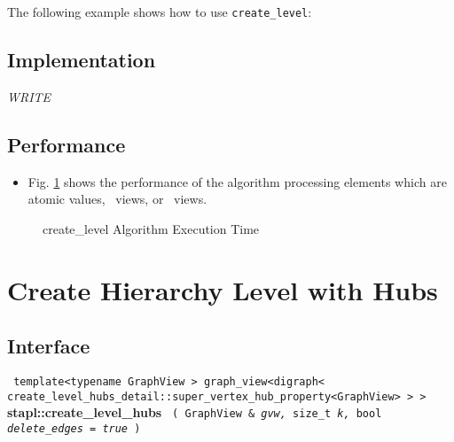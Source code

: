 The following example shows how to use 
\texttt{create\_level}:


\subsection{Implementation} \label{sec-create-level-all-alg-impl}

\textit{WRITE}

\subsection{Performance} \label{sec-create-level-all-alg-perf}

\begin{itemize}
\item
Fig. \ref{fig:cr-level-all-alg-exec-exper}
shows the performance of the algorithm processing
elements which are atomic values, \stl\ views, or \stapl\ views.
\end{itemize}

\begin{figure}[p]
\caption{ create\_level Algorithm Execution Time}
\label{fig:cr-level-all-alg-exec-exper}
\end{figure}


\section{ Create Hierarchy Level with Hubs}
\label{sec-create-level-hubs-alg}

\subsection{Interface} \label{sec-create-level-hubs-alg-inter}

\noindent
\texttt{%
template<typename GraphView >
\newline
graph\_view<digraph< create\_level\_hubs\_detail::super\_vertex\_hub\_property<GraphView> > > 
}
\newline
\textbf{stapl::create\_level\_hubs}%
\newline
\texttt{%
(
GraphView \&
\textit{gvw,}%
size\_t
\textit{k,}%
bool
\textit{delete\_edges = true}%
)     
}
\vspace{0.4cm}

